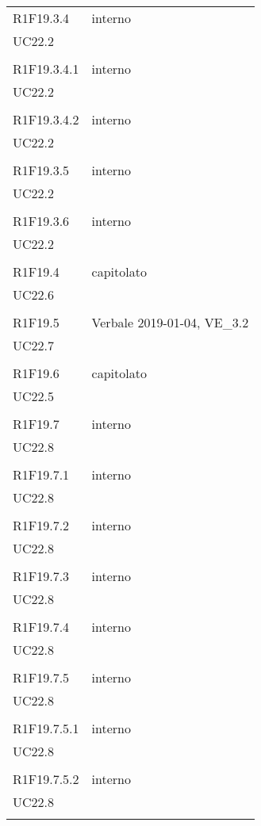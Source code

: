 \begin{longtable}{ >{\centering}p{}
		>{\centering}p{}}
	R1F19.3.4 & interno\\UC22.2\\\tabularnewline
	
	R1F19.3.4.1 & interno\\UC22.2\\\tabularnewline
	
	R1F19.3.4.2 & interno\\UC22.2\\\tabularnewline
	
	R1F19.3.5 & interno\\UC22.2\\\tabularnewline
	
	R1F19.3.6 & interno\\UC22.2\\\tabularnewline
	
	R1F19.4 & capitolato\\UC22.6\\\tabularnewline
	
	R1F19.5 & Verbale 2019-01-04, VE\_3.2\\UC22.7\\\tabularnewline
	
	R1F19.6 & capitolato\\UC22.5\\\tabularnewline
	
	R1F19.7 & interno\\UC22.8\\\tabularnewline
	
	R1F19.7.1 & interno\\UC22.8\\\tabularnewline
	
	R1F19.7.2 & interno\\UC22.8\\\tabularnewline
	
	R1F19.7.3 & interno\\UC22.8\\\tabularnewline
	
	R1F19.7.4 & interno\\UC22.8\\\tabularnewline
	
	R1F19.7.5 & interno\\UC22.8\\\tabularnewline
	
	R1F19.7.5.1 & interno\\UC22.8\\\tabularnewline
	
	R1F19.7.5.2 & interno\\UC22.8\\\tabularnewline
	

\end{longtable}
